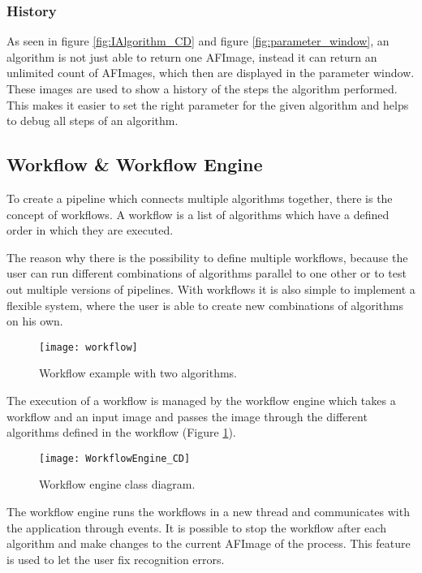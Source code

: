 \subsubsection{History}
As seen in figure \ref{fig:IAlgorithm_CD} and figure \ref{fig:parameter_window}, an algorithm is not just able to return one AFImage, instead it can return an unlimited count of AFImages, which then are displayed in the parameter window. These images are used to show a history of the steps the algorithm performed. This makes it easier to set the right parameter for the given algorithm and helps to debug all steps of an algorithm.

\pagebreak
\subsection{Workflow \& Workflow Engine}
To create a pipeline which connects multiple algorithms together, there is the concept of workflows. A workflow is a list of algorithms which have a defined order in which they are executed.

The reason why there is the possibility to define multiple workflows, because the user can run different combinations of algorithms parallel to one other or to test out multiple versions of pipelines. With workflows it is also simple to implement a flexible system, where the user is able to create new combinations of algorithms on his own.

\begin{figure}[h]
  \centering
      \texttt{[image: workflow]}
  \caption{Workflow example with two algorithms.}
  \label{fig:Workflow}
\end{figure}

The execution of a workflow is managed by the workflow engine which takes a workflow and an input image and passes the image through the different algorithms defined in the workflow (Figure \ref{fig:Workflow}).

\begin{figure}[h]
  \centering
      \texttt{[image: WorkflowEngine\_CD]}
  \caption{Workflow engine class diagram.}
  \label{fig:WorkflowEngine_CD}
\end{figure}

The workflow engine runs the workflows in a new thread and communicates with the application through events. It is possible to stop the workflow after each algorithm and make changes to the current AFImage of the process. This feature is used to let the user fix recognition errors.


